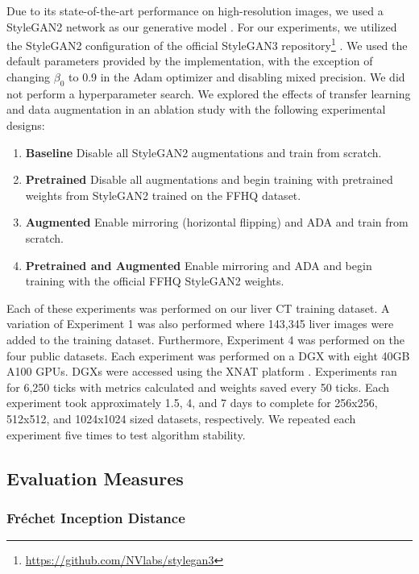 \documentclass[runningheads]{llncs}
\begin{document}
Due to its state-of-the-art performance on high-resolution images, we used a StyleGAN2 network as our generative model \cite{Karras2020_2}.
For our experiments, we utilized the StyleGAN2 configuration of the official StyleGAN3 repository\footnote{\url{https://github.com/NVlabs/stylegan3}} \cite{Karras2021}.
We used the default parameters provided by the implementation, with the exception of changing $\beta_0$ to 0.9 in the Adam optimizer and disabling mixed precision.
We did not perform a hyperparameter search.
We explored the effects of transfer learning and data augmentation in an ablation study with the following experimental designs:
\begin{enumerate}
    \item \textbf{Baseline} Disable all StyleGAN2 augmentations and train from scratch.
    \item \textbf{Pretrained} Disable all augmentations and begin training with pretrained weights from StyleGAN2 trained on the FFHQ dataset.
    \item \textbf{Augmented} Enable mirroring (horizontal flipping) and ADA and train from scratch.
    \item \textbf{Pretrained and Augmented} Enable mirroring and ADA and begin training with the official FFHQ StyleGAN2 weights.
\end{enumerate}
Each of these experiments was performed on our liver CT training dataset.
A variation of Experiment 1 was also performed where 143,345 liver images were added to the training dataset.
Furthermore, Experiment 4 was performed on the four public datasets.
Each experiment was performed on a DGX with eight 40GB A100 GPUs.
DGXs were accessed using the XNAT platform \cite{marcus2007}.
Experiments ran for 6,250 ticks with metrics calculated and weights saved every 50 ticks.
Each experiment took approximately 1.5, 4, and 7 days to complete for 256x256, 512x512, and 1024x1024 sized datasets, respectively.
We repeated each experiment five times to test algorithm stability.

\subsection{Evaluation Measures}

\subsubsection{Fr\'{e}chet Inception Distance}
\end{document}
